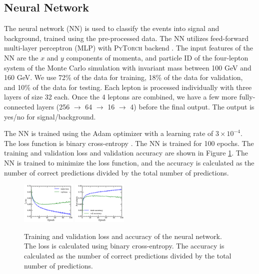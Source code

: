 \subsection{Neural Network}
The neural network (NN) is used to classify the events into signal and background, trained using the pre-processed data. The NN utilizes feed-forward multi-layer perceptron (MLP) \cite{rumelhart1986learning} with \textsc{PyTorch} backend \cite{paszke2019pytorch}. The input features of the NN are the $x$ and $y$ components of momenta, and particle ID of the four-lepton system of the Monte Carlo simulation with invariant mass between 100 GeV and 160 GeV. We use 72\% of the data for training, 18\% of the data for validation, and 10\% of the data for testing. Each lepton is processed individually with three layers of size 32 each. Once the 4 leptons are combined, we have a few more fully-connected layers (256 $\to$ 64 $\to$ 16 $\to$ 4) before the final output. The output is yes/no for signal/background. 

The NN is trained using the Adam optimizer \cite{kingma2014adam} with a learning rate of $3\times10^{-4}$. The loss function is binary cross-entropy \cite{goodfellow2016deep}. The NN is trained for 100 epochs. The training and validation loss and validation accuracy are shown in Figure \ref{fig:accuracy}. The NN is trained to minimize the loss function, and the accuracy is calculated as the number of correct predictions divided by the total number of predictions. 
\begin{figure}[h]
  \centering
  \includegraphics[width=0.23\textwidth]{Figures/training_loss.png}
  \includegraphics[width=0.23\textwidth]{Figures/training_accuracy.png}
  \caption{Training and validation loss and accuracy of the neural network. The loss is calculated using binary cross-entropy. The accuracy is calculated as the number of correct predictions divided by the total number of predictions.}
  \label{fig:accuracy}
\end{figure}

